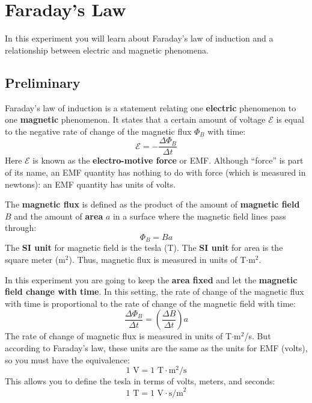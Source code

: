 \setcounter{chapter}{3}
\chapter{Faraday's Law}
In this experiment you will learn about Faraday's law of induction and a relationship between electric and magnetic phenomena.
\section{Preliminary}
Faraday's law of induction is a statement relating one \textbf{electric} phenomenon to one \textbf{magnetic} phenomenon. It states that a certain amount of voltage $\mathcal{E}$ is equal to the negative rate of change of the magnetic flux $\Phi_{B}$ with time:
\begin{equation}
	\mathcal{E} = -\frac{\Delta \Phi_{B}}{\Delta t}
	\label{eq.04.faradays.law}
\end{equation}
Here $\mathcal{E}$ is known as the \textbf{electro-motive force} or EMF. Although ``force'' is part of its name, an EMF quantity has nothing to do with force (which is measured in newtons): an EMF quantity has units of volts.

The \textbf{magnetic flux} is defined as the product of the amount of \textbf{magnetic field} $B$ and the amount of \textbf{area} $a$ in a surface where the magnetic field lines pass through:
\begin{equation}
	\Phi_{B} = B a
\end{equation}
The \textbf{SI unit} for magnetic field is the tesla (T). The \textbf{SI unit} for area is the square meter (m$^{2}$). Thus, magnetic flux is measured in units of T$\cdot$m$^{2}$.

In this experiment you are going to keep the \textbf{area fixed} and let the \textbf{magnetic field change with time}. In this setting, the rate of change of the magnetic flux with time is proportional to the rate of change of the magnetic field with time:
\begin{equation}
	\frac{\Delta \Phi_{B}}{\Delta t} = \left(\frac{\Delta B}{\Delta t}\right) a
	\label{eq.04.flux.rate}
\end{equation}
The rate of change of magnetic flux is measured in units of T$\cdot$m$^{2}$/s. But according to Faraday's law, these units are the same as the units for EMF (volts), so you must have the equivalence:
\begin{equation}
	1 \text{ V} = 1 \text{ T} \cdot \text{m}^{2}\text{/s}
\end{equation}
This allows you to define the tesla in terms of volts, meters, and seconds:
\begin{equation}
	1 \text{ T} = 1 \text{ V} \cdot \text{s/m}^2
\end{equation}

